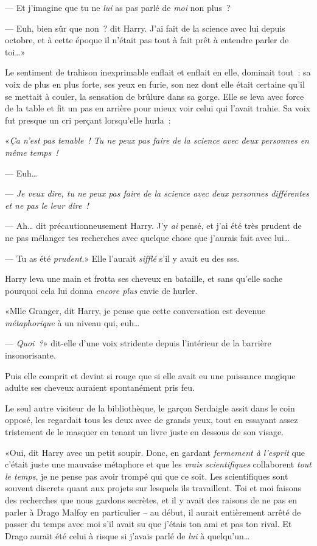 --- Et j'imagine que tu ne \emph{lui} as pas parlé de \emph{moi} non plus~?

--- Euh, bien sûr que non~? dit Harry. J'ai fait de la science avec lui depuis octobre, et à cette époque il n'était pas tout à fait prêt à entendre parler de toi…»

Le sentiment de trahison inexprimable enflait et enflait en elle, dominait tout~: sa voix de plus en plus forte, ses yeux en furie, son nez dont elle était certaine qu'il se mettait à couler, la sensation de brûlure dans sa gorge. Elle se leva avec force de la table et fit un pas en arrière pour mieux voir celui qui l'avait trahie. Sa voix fut presque un cri perçant lorsqu'elle hurla~:

«\emph{Ça n'est pas tenable~! Tu ne peux pas faire de la science avec deux personnes en même temps~!}

--- Euh…

--- \emph{Je veux dire, tu ne peux pas faire de la science avec deux personnes différentes et ne pas le leur dire~!}

--- Ah… dit précautionneusement Harry. J'y \emph{ai} pensé, et j'ai été très prudent de ne pas mélanger tes recherches avec quelque chose que j'aurais fait avec lui…

--- Tu as été \emph{prudent}.» Elle l'aurait \emph{sifflé} s'il y avait eu des sss.

Harry leva une main et frotta ses cheveux en bataille, et sans qu'elle sache pourquoi cela lui donna \emph{encore plus} envie de hurler.

«Mlle Granger, dit Harry, je pense que cette conversation est devenue \emph{métaphorique} à un niveau qui, euh…

--- \emph{Quoi~?}» dit-elle d'une voix stridente depuis l'intérieur de la barrière insonorisante.

Puis elle comprit et devint si rouge que si elle avait eu une puissance magique adulte ses cheveux auraient spontanément pris feu.

Le seul autre visiteur de la bibliothèque, le garçon Serdaigle assit dans le coin opposé, les regardait tous les deux avec de grands yeux, tout en essayant assez tristement de le masquer en tenant un livre juste en dessous de son visage.

«Oui, dit Harry avec un petit soupir. Donc, en gardant \emph{fermement à l'esprit} que c'était juste une mauvaise métaphore et que les \emph{vrais scientifiques} collaborent \emph{tout le temps}, je ne pense pas avoir trompé qui que ce soit. Les scientifiques sont souvent discrets quant aux projets sur lesquels ils travaillent. Toi et moi faisons des recherches que nous gardons secrètes, et il y avait des raisons de ne pas en parler à Drago Malfoy en particulier -- au début, il aurait entièrement arrêté de passer du temps avec moi s'il avait su que j'étais ton ami et pas ton rival. Et Drago aurait été celui à risque si j'avais parlé de \emph{lui} à quelqu'un…

